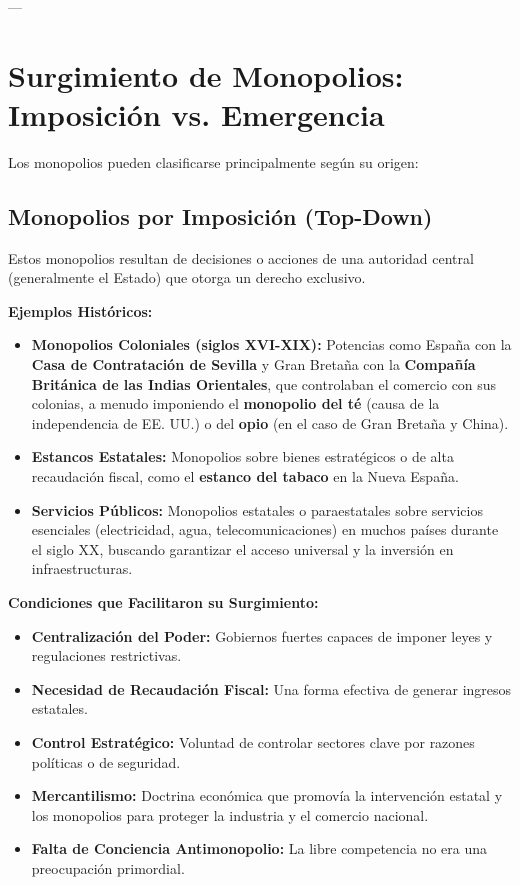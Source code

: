 \documentclass{article}
\begin{document}
---

\section{Surgimiento de Monopolios: Imposición vs. Emergencia}

Los monopolios pueden clasificarse principalmente según su origen:

\subsection{Monopolios por Imposición (Top-Down)}
Estos monopolios resultan de decisiones o acciones de una autoridad central (generalmente el Estado) que otorga un derecho exclusivo.

\textbf{Ejemplos Históricos:}
\begin{itemize}
    \item \textbf{Monopolios Coloniales (siglos XVI-XIX):} Potencias como España con la \textbf{Casa de Contratación de Sevilla} y Gran Bretaña con la \textbf{Compañía Británica de las Indias Orientales}, que controlaban el comercio con sus colonias, a menudo imponiendo el \textbf{monopolio del té} (causa de la independencia de EE. UU.) o del \textbf{opio} (en el caso de Gran Bretaña y China).
    \item \textbf{Estancos Estatales:} Monopolios sobre bienes estratégicos o de alta recaudación fiscal, como el \textbf{estanco del tabaco} en la Nueva España.
    \item \textbf{Servicios Públicos:} Monopolios estatales o paraestatales sobre servicios esenciales (electricidad, agua, telecomunicaciones) en muchos países durante el siglo XX, buscando garantizar el acceso universal y la inversión en infraestructuras.
\end{itemize}

\textbf{Condiciones que Facilitaron su Surgimiento:}
\begin{itemize}
    \item \textbf{Centralización del Poder:} Gobiernos fuertes capaces de imponer leyes y regulaciones restrictivas.
    \item \textbf{Necesidad de Recaudación Fiscal:} Una forma efectiva de generar ingresos estatales.
    \item \textbf{Control Estratégico:} Voluntad de controlar sectores clave por razones políticas o de seguridad.
    \item \textbf{Mercantilismo:} Doctrina económica que promovía la intervención estatal y los monopolios para proteger la industria y el comercio nacional.
    \item \textbf{Falta de Conciencia Antimonopolio:} La libre competencia no era una preocupación primordial.
\end{itemize}
\end{document}
